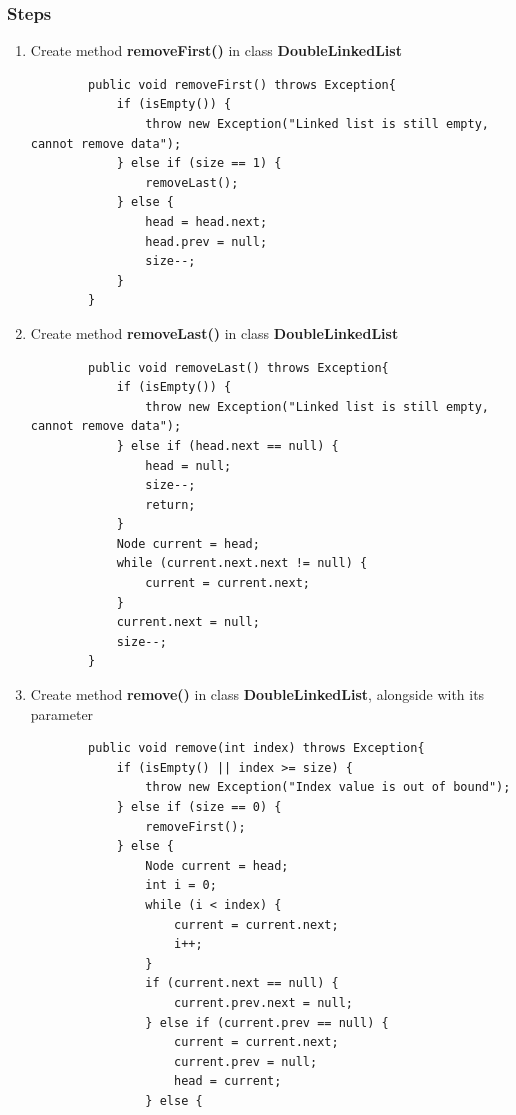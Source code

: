 \documentclass[12pt,titlepage]{article}
\begin{document}
\subsubsection{Steps}
\begin{enumerate}
    \item Create method \textbf{removeFirst()} in class \textbf{DoubleLinkedList}
    \begin{verbatim}
        public void removeFirst() throws Exception{
            if (isEmpty()) {
                throw new Exception("Linked list is still empty, cannot remove data");
            } else if (size == 1) {
                removeLast();
            } else {
                head = head.next;
                head.prev = null;
                size--;
            }
        }
    \end{verbatim}
    \item Create method \textbf{removeLast()} in class \textbf{DoubleLinkedList}
    \begin{verbatim}
        public void removeLast() throws Exception{
            if (isEmpty()) {
                throw new Exception("Linked list is still empty, cannot remove data");
            } else if (head.next == null) {
                head = null;
                size--;
                return;
            } 
            Node current = head;
            while (current.next.next != null) {
                current = current.next;
            }
            current.next = null;
            size--;
        }
    \end{verbatim}
    \item Create method \textbf{remove()} in class \textbf{DoubleLinkedList}, alongside with its parameter
    \begin{verbatim}
        public void remove(int index) throws Exception{
            if (isEmpty() || index >= size) {
                throw new Exception("Index value is out of bound");
            } else if (size == 0) {
                removeFirst();
            } else {
                Node current = head;
                int i = 0;
                while (i < index) {
                    current = current.next;
                    i++;
                }
                if (current.next == null) {
                    current.prev.next = null;
                } else if (current.prev == null) {
                    current = current.next;
                    current.prev = null;
                    head = current;
                } else {

\end{verbatim}
\end{enumerate}
\end{document}
